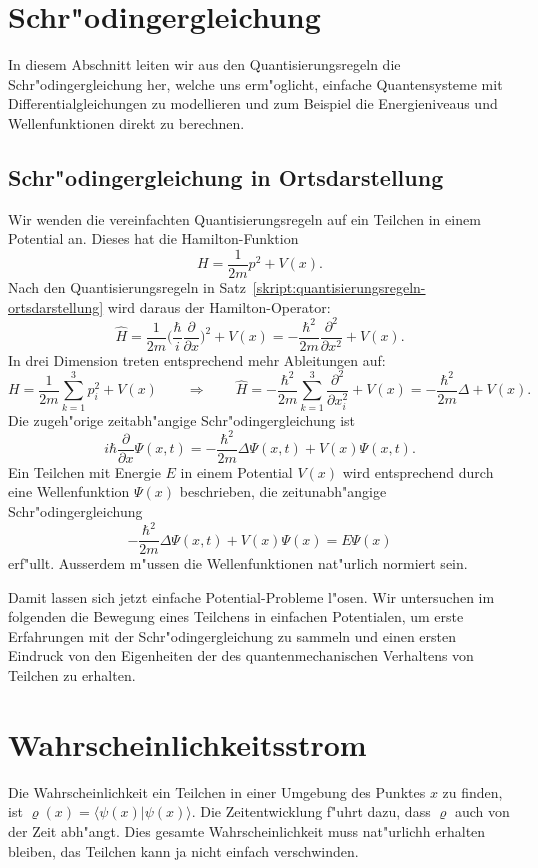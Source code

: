 \section{Schr"odingergleichung}
In diesem Abschnitt leiten wir aus den Quantisierungsregeln die
Schr"odingergleichung her, welche uns erm"oglicht, einfache
Quantensysteme mit Differentialgleichungen zu modellieren
und zum Beispiel die Energieniveaus und Wellenfunktionen direkt
zu berechnen.

\subsection{Schr"odingergleichung in Ortsdarstellung}
Wir wenden die vereinfachten Quantisierungsregeln auf ein
Teilchen in einem Potential an.
Dieses hat die Hamilton-Funktion
\[
H=\frac1{2m}p^2+V(x).
\]
Nach den Quantisierungsregeln in
Satz~\ref{skript:quantisierungsregeln-ortsdarstellung} wird daraus
der Hamilton-Operator:
\[
\hat H
=
\frac{1}{2m}\biggl(\frac{\hbar}{i}\frac{\partial }{\partial x}\biggr)^2
+V(x)
=
-\frac{\hbar^2}{2m}\frac{\partial^2}{\partial x^2}+V(x).
\]
In drei Dimension treten entsprechend mehr Ableitungen auf:
\[
H=\frac1{2m}\sum_{k=1}^3p_i^2+V(x)
\qquad\Rightarrow\qquad
\hat H
=
-\frac{\hbar^2}{2m}\sum_{k=1}^3\frac{\partial^2}{\partial x_i^2}+V(x)
=
-\frac{\hbar^2}{2m}\Delta + V(x).
\]
Die zugeh"orige zeitabh"angige Schr"odingergleichung ist
\[
i\hbar\frac{\partial}{\partial x}\Psi(x,t)
=
-\frac{\hbar^2}{2m}\Delta\Psi(x,t) + V(x)\Psi(x,t).
\]
Ein Teilchen mit Energie $E$ in einem Potential $V(x)$ wird entsprechend
durch eine Wellenfunktion $\Psi(x)$ beschrieben, die zeitunabh"angige
Schr"odingergleichung
\[
-\frac{\hbar^2}{2m}\Delta\Psi(x,t) + V(x)\Psi(x)
=
E\Psi(x)
\]
erf"ullt.
Ausserdem m"ussen die Wellenfunktionen nat"urlich normiert sein.

Damit lassen sich jetzt einfache Potential-Probleme l"osen.
Wir untersuchen im folgenden die Bewegung eines Teilchens in einfachen
Potentialen, um erste Erfahrungen mit der Schr"odingergleichung
zu sammeln und einen ersten Eindruck von den Eigenheiten der
des quantenmechanischen Verhaltens von Teilchen zu erhalten.




\section{Wahrscheinlichkeitsstrom}
Die Wahrscheinlichkeit ein Teilchen in einer Umgebung des
Punktes $x$ zu finden, ist $\varrho(x)=\langle \psi(x)|\psi(x)\rangle$.
Die Zeitentwicklung f"uhrt dazu, dass $\varrho$ auch von der
Zeit abh"angt.
Dies gesamte Wahrscheinlichkeit muss nat"urlichh erhalten bleiben,
das Teilchen kann ja nicht einfach verschwinden.

